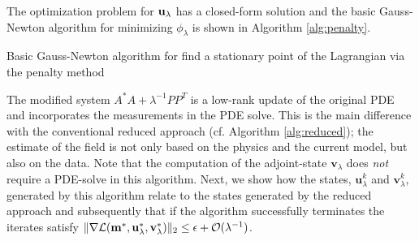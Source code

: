 \documentclass{iopart}
\begin{document}
The optimization problem for $\mathbf{u}_{\lambda}$ has a closed-form solution and 
the basic Gauss-Newton algorithm for minimizing $\phi_{\lambda}$ is shown in Algorithm \ref{alg:penalty}.

\begin{algorithm}
\caption{Basic Gauss-Newton algorithm for find a stationary point of the Lagrangian via the penalty method}
\label{alg:penalty}
\begin{algorithmic}
\REPEAT
{}
\end{algorithmic}
\end{algorithm}

The modified system $A^*A + \lambda^{-1}PP^T$ is a low-rank update of the original PDE and
incorporates the measurements in the PDE solve. This is the main difference with the conventional reduced approach (cf. Algorithm \ref{alg:reduced}); 
the estimate of the field is not only based on the physics and the current model, but also on the data.
Note that the computation of the adjoint-state $\mathbf{v}_{\lambda}$ does \emph{not} require a PDE-solve
in this algorithm.
Next, we show how the states, $\mathbf{u}^k_{\lambda}$ and $\mathbf{v}^k_{\lambda}$, generated by this algorithm  
relate to the states generated by the reduced approach and subsequently that if the algorithm successfully terminates
the iterates satisfy $\|\nabla\mathcal{L}(\mathbf{m}^*, \mathbf{u}^*_{\lambda}, \mathbf{v}^*_{\lambda})\|_2 \leq \epsilon + \mathcal{O}(\lambda^{-1})$.
\end{document}
